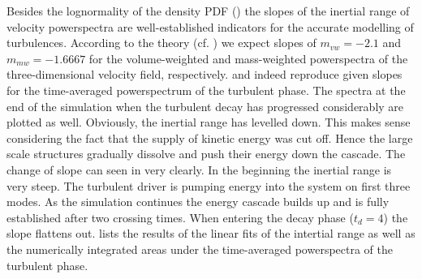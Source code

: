 
Besides the lognormality of the density PDF () the
slopes of the inertial range of velocity powerspectra are well-established
indicators for the accurate modelling of turbulences. According to the theory
(cf.  ) we expect slopes of $m_{vw} =
-2.1$ and $m_{mw} = -1.6667$ for the volume-weighted and mass-weighted
powerspectra of the three-dimensional velocity field, respectively.
 and
 indeed reproduce
given slopes for the time-averaged powerspectrum of the turbulent phase.  The
spectra at the end of the simulation when the turbulent decay has progressed
considerably are plotted as well. Obviously, the inertial range has levelled
down. This makes sense considering the fact that the supply of kinetic energy
was cut off. Hence the large scale structures gradually dissolve and
push their energy down the cascade. The change of slope can seen in
 very clearly. In
the beginning the inertial range is very steep. The turbulent driver is pumping
energy into the system on first three modes. As the simulation continues the
energy cascade builds up and is fully established after two crossing times.
When entering the decay phase ($t_d = 4$) the slope flattens out.
 lists the results of the linear fits of the intertial range
as well as the numerically integrated areas under the time-averaged powerspectra
of the turbulent phase.

